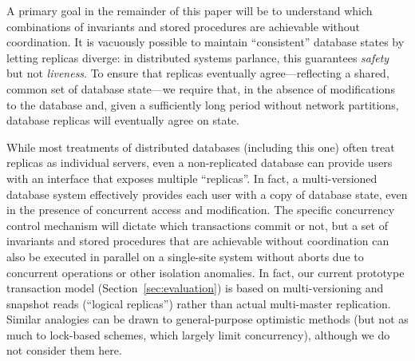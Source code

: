 A primary goal in the remainder of this paper will be to understand
which combinations of invariants and stored procedures are achievable
without coordination. It is vacuously possible to maintain
``consistent'' database states by letting replicas diverge: in
distributed systems parlance, this guarantees \textit{safety} but not
\textit{liveness}. To ensure that replicas eventually
agree---reflecting a shared, common set of database state---we require
that, in the absence of modifications to the database and, given a
sufficiently long period without network partitions, database replicas
will eventually agree on state.


 While most treatments of
distributed databases (including this one) often treat replicas as
individual servers, even a non-replicated database can provide users
with an interface that exposes multiple ``replicas''. In fact, a
multi-versioned database system effectively provides each user with a
copy of database state, even in the presence of concurrent access and
modification. The specific concurrency control mechanism will dictate
which transactions commit or not, but a set of invariants and stored
procedures that are achievable without coordination can also be
executed in parallel on a single-site system without aborts due to
concurrent operations or other isolation anomalies.  In fact, our
current prototype transaction model (Section~\ref{sec:evaluation}) is
based on multi-versioning and snapshot reads (``logical replicas'')
rather than actual multi-master replication. Similar analogies can be
drawn to general-purpose optimistic methods (but not as much to
lock-based schemes, which largely limit concurrency), although we do
not consider them here.
